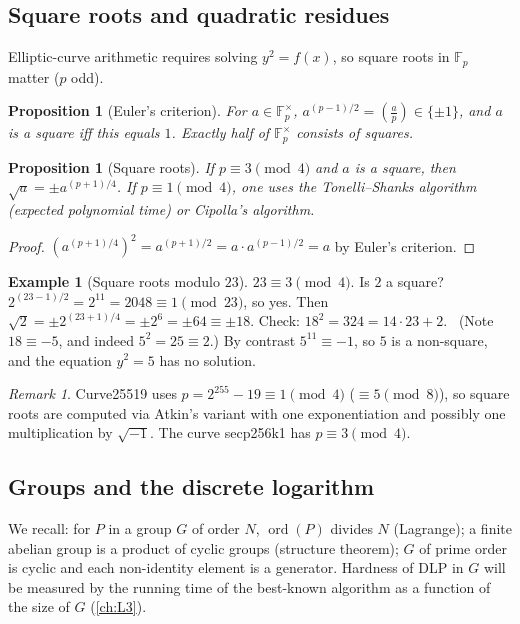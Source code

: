 \documentclass[11pt,a4paper,oneside]{book}
\theoremstyle{plain}
\newtheorem{proposition}[theorem]{Proposition}
\theoremstyle{definition}
\newtheorem{example}[theorem]{Example}
\theoremstyle{remark}
\newtheorem{remark}[theorem]{Remark}
\newcommand{\F}{\mathbb{F}}
\newcommand{\ord}{\operatorname{ord}}
\newcommand{\legendre}[2]{\left(\frac{#1}{#2}\right)}
\begin{document}
\subsection{Square roots and quadratic residues}

Elliptic-curve arithmetic requires solving $y^2=f(x)$, so square roots in $\F_p$ matter ($p$ odd).

\begin{proposition}[Euler's criterion]\label{prop:euler}
For $a\in\F_p^\times$, $a^{(p-1)/2}=\legendre{a}{p}\in\{\pm1\}$, and $a$ is a square iff this equals $1$. Exactly half of $\F_p^\times$ consists of squares.
\end{proposition}

\begin{proposition}[Square roots]
If $p\equiv3\pmod 4$ and $a$ is a square, then $\sqrt{a}=\pm a^{(p+1)/4}$. If $p\equiv 1\pmod 4$, one uses the Tonelli--Shanks algorithm (expected polynomial time) or Cipolla's algorithm.
\end{proposition}
\begin{proof}
$(a^{(p+1)/4})^2=a^{(p+1)/2}=a\cdot a^{(p-1)/2}=a$ by Euler's criterion.
\end{proof}

\begin{example}[Square roots modulo $23$]
$23\equiv3\pmod4$. Is $2$ a square? $2^{(23-1)/2}=2^{11}=2048\equiv1\pmod{23}$, so yes. Then $\sqrt2=\pm2^{(23+1)/4}=\pm2^6=\pm64\equiv\pm18$. Check: $18^2=324=14\cdot23+2$. \checkmark\ (Note $18\equiv-5$, and indeed $5^2=25\equiv2$.) By contrast $5^{11}\equiv-1$, so $5$ is a non-square, and the equation $y^2=5$ has no solution.
\end{example}

\begin{remark}
Curve25519 uses $p=2^{255}-19\equiv 1\pmod 4$ ($\equiv 5\pmod 8$), so square roots are computed via Atkin's variant with one exponentiation and possibly one multiplication by $\sqrt{-1}$. The curve secp256k1 has $p\equiv 3\pmod 4$.
\end{remark}

\subsection{Groups and the discrete logarithm}

We recall: for $P$ in a group $G$ of order $N$, $\ord(P)$ divides $N$ (Lagrange); a finite abelian group is a product of cyclic groups (structure theorem); $G$ of prime order is cyclic and each non-identity element is a generator.
Hardness of DLP in $G$ will be measured by the running time of the best-known algorithm as a function of the size of $G$ (\cref{ch:L3}).
\end{document}
